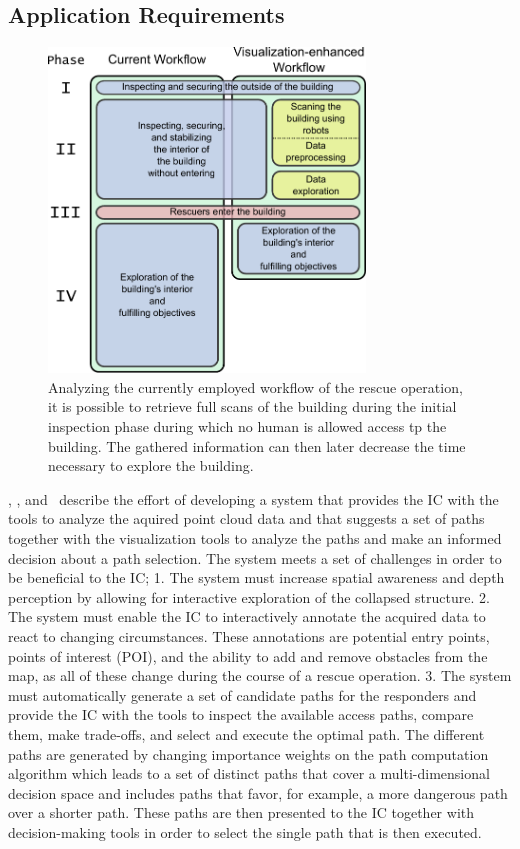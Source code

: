 \subsection{Application Requirements} \label{contributions:usar:requirements}
\begin{figure}
\centering
\includegraphics[width=0.75\textwidth]{figures/contributions/usar/workflow.pdf}
\caption{Analyzing the currently employed workflow of the rescue operation, it is possible to retrieve full scans of the building during the initial inspection phase during which no human is allowed access tp the building.  The gathered information can then later decrease the time necessary to explore the building.}
\label{contributions:usar:workflow}
\end{figure}

\paperVMV, \paperSSRR, and \paperCGF\ describe the effort of developing a system that provides the IC with the tools to analyze the aquired point cloud data and that suggests a set of paths together with the visualization tools to analyze the paths and make an informed decision about a path selection.  The system meets a set of challenges in order to be beneficial to the IC; 1. The system must increase spatial awareness and depth perception by allowing for interactive exploration of the collapsed structure.  2. The system must enable the IC to interactively annotate the acquired data to react to changing circumstances.  These annotations are potential entry points, points of interest (POI), and the ability to add and remove obstacles from the map, as all of these change during the course of a rescue operation.  3. The system must automatically generate a set of candidate paths for the responders and provide the IC with the tools to inspect the available access paths, compare them, make trade-offs, and select and execute the optimal path.  The different paths are generated by changing importance weights on the path computation algorithm which leads to a set of distinct paths that cover a multi-dimensional decision space and includes paths that favor, for example, a more dangerous path over a shorter path.  These paths are then presented to the IC together with decision-making tools in order to select the single path that is then executed.



